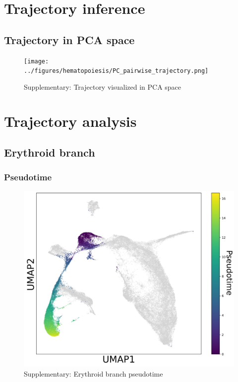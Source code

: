 \documentclass[a4paper]{article}
\begin{document}
\FloatBarrier
\section{Trajectory inference}

\subsection{Trajectory in PCA space}
\begin{figure}[!htb]
  \centering
  \texttt{[image: ../figures/hematopoiesis/PC\_pairwise\_trajectory.png]}
  \caption{Supplementary: Trajectory visualized in PCA space}
\end{figure}


\FloatBarrier
\section{Trajectory analysis}
\subsection{Erythroid branch}

\subsubsection{Pseudotime}
\begin{figure}[!htb]
  \centering
  \includegraphics[width=\textwidth]{../figures/hematopoiesis/Erythroid_40_103_single_branch_pseudotime.png}
  \caption{Supplementary: Erythroid branch pseudotime}
\end{figure}
\end{document}
